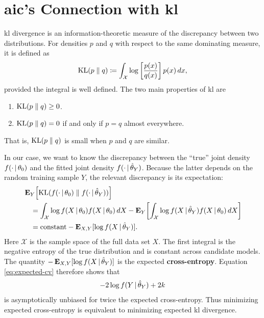 \documentclass[a4paper,12pt]{article}
\begin{document}
\section{\texorpdfstring{\acrshort{aic}}{AIC}'s Connection with \texorpdfstring{\acrlong{kl}}{KL Divergence}}

\acrshort{kl} divergence is an information-theoretic measure of the discrepancy between two distributions.
For densities $p$ and $q$ with respect to the same dominating measure, it is defined as
\begin{align*}
	\operatorname{KL}(p\;\|\; q)
	\coloneqq
	\int_{\mathcal X}\log\left[\frac{p(x)}{q(x)}\right]p(x)\,d{x},
\end{align*}
provided the integral is well defined.
The two main properties of \acrshort{kl} are
\begin{enumerate}
	\item $\operatorname{KL}(p\;\|\; q)\geq0$.
	\item $\operatorname{KL}(p\;\|\; q)=0$ if and only if $p=q$ almost everywhere.
\end{enumerate}
That is, $\operatorname{KL}(p\;\|\; q)$ is small when $p$ and $q$ are similar.

In our case, we want to know the discrepancy between
the ``true'' joint density $f(\cdot\,|\,\theta_{0})$ and
the fitted joint density $f(\cdot\,|\,\hat\theta_{Y})$.
Because the latter depends on the random training sample $Y$, the relevant discrepancy is its expectation:
\begin{align*}
	&\operatorname{\text{\textrm{\upshape\textbf{E}}}}_Y\!\left[
	\operatorname{KL}(f(\cdot\,|\,\theta_0)\;\|\; f(\cdot\,|\,\hat\theta_Y))
	\right]\\
	&\quad=
	\int_{\mathcal X}
	\log f(X\,|\,\theta_0)f(X\,|\,\theta_0)\,d{X}
	-
	\operatorname{\text{\textrm{\upshape\textbf{E}}}}_Y\!\left[
	\int_{\mathcal X}
	\log f(X\,|\,\hat\theta_Y)f(X\,|\,\theta_0)\,d{X}
	\right]\\
	&\quad=
	\text{constant}
	-\operatorname{\text{\textrm{\upshape\textbf{E}}}}_{X,Y}[\log f(X\,|\,\hat\theta_Y)].
\end{align*}
Here $\mathcal X$ is the sample space of the full data set $X$.
The first integral is the negative entropy of the true distribution and is constant across candidate models.
The quantity $-\operatorname{\text{\textrm{\upshape\textbf{E}}}}_{X,Y}[\log f(X\,|\,\hat\theta_Y)]$ is the expected \textbf{cross-entropy}.
Equation \eqref{eq:expected-cv} therefore shows that
\begin{align*}
	-2\log f(Y\,|\,\hat\theta_Y)+2k
\end{align*}
is asymptotically unbiased for twice the expected cross-entropy.
Thus minimizing expected cross-entropy is equivalent to minimizing expected \acrshort{kl} divergence.
\end{document}

